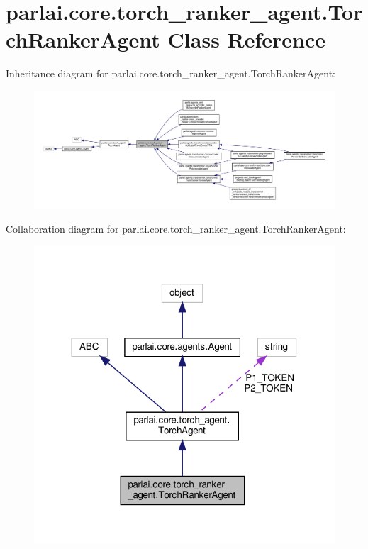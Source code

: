 \hypertarget{classparlai_1_1core_1_1torch__ranker__agent_1_1TorchRankerAgent}{}\section{parlai.\+core.\+torch\+\_\+ranker\+\_\+agent.\+Torch\+Ranker\+Agent Class Reference}
\label{classparlai_1_1core_1_1torch__ranker__agent_1_1TorchRankerAgent}


Inheritance diagram for parlai.\+core.\+torch\+\_\+ranker\+\_\+agent.\+Torch\+Ranker\+Agent\+:
\nopagebreak
\begin{figure}[H]
\begin{center}
\leavevmode
\includegraphics[width=350pt]{d3/df3/classparlai_1_1core_1_1torch__ranker__agent_1_1TorchRankerAgent__inherit__graph}
\end{center}
\end{figure}


Collaboration diagram for parlai.\+core.\+torch\+\_\+ranker\+\_\+agent.\+Torch\+Ranker\+Agent\+:
\nopagebreak
\begin{figure}[H]
\begin{center}
\leavevmode
\includegraphics[width=318pt]{dd/d66/classparlai_1_1core_1_1torch__ranker__agent_1_1TorchRankerAgent__coll__graph}
\end{center}
\end{figure}
